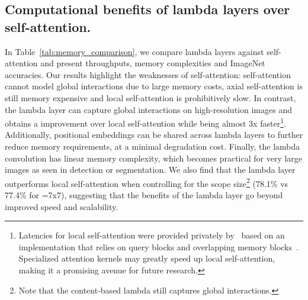 \documentclass{article} \usepackage{iclr2021_conference,times}
\begin{document}
\subsection{Computational benefits of lambda layers over self-attention.}
In Table~\ref{tab:memory_comparison}, we compare lambda layers against self-attention and present throughputs, memory complexities and ImageNet accuracies.
Our results highlight the weaknesses of self-attention:
self-attention cannot model global interactions due to large memory costs, axial self-attention is still memory expensive and local self-attention is prohibitively slow.
In contrast, the lambda layer can capture global interactions on high-resolution images and obtains a  improvement over local self-attention while being almost 3x faster\footnote{
Latencies for local self-attention were provided privately by~\cite{ramachandran2019sasa} based on an implementation that relies on query blocks and overlapping memory blocks~\citep{parmar2018image}. 
Specialized attention kernels may greatly speed up local self-attention, making it a promising avenue for future research.
}.
Additionally, positional embeddings can be shared across lambda layers to further reduce memory requirements, at a minimal degradation cost.
Finally, the lambda convolution has linear memory complexity, which becomes practical for very large images as seen in detection or segmentation.
We also find that the lambda layer outperforms local self-attention when controlling for the scope size\footnote{Note that the content-based lambda still captures global interactions.} (78.1\% vs 77.4\% for =7x7), suggesting that the benefits of the lambda layer go beyond improved speed and scalability.
\end{document}
